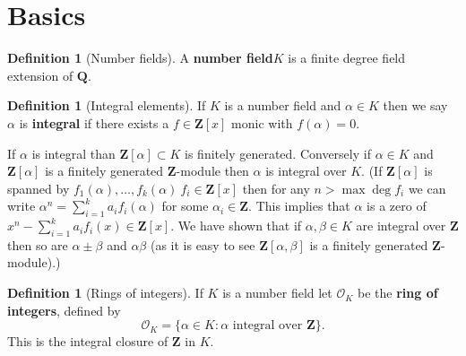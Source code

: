 \documentclass[10pt,]{book}
\newcommand{\gt}{>}
\newcommand{\terminology}[1]{\textbf{#1}}
\theoremstyle{plain}
\theoremstyle{definition}
\newtheorem{definition}[theorem]{Definition}
\newcommand{\QQ}{\mathbf{Q}}
\newcommand{\ZZ}{\mathbf{Z}}
\newcommand{\cO}{\mathcal{O}}
\begin{document}
\section[Basics]{Basics}\label{sec-basics}
\begin{definition}[Number fields]\label{definition-1}
A \terminology{number field}\(K\) is a finite degree field extension of \(\QQ\).\end{definition}
\begin{definition}[Integral elements]\label{definition-2}
If \(K\) is a number field and \(\alpha\in K\) then we say \(\alpha\) is \terminology{integral} if there exists a \(f\in\ZZ[x]\) monic with \(f(\alpha) = 0\).\end{definition}
If \(\alpha\) is integral than \(\ZZ[\alpha] \subset K\) is finitely generated.
          Conversely if \(\alpha\in K\) and \(\ZZ[\alpha]\) is a finitely generated \(\ZZ\)-module then \(\alpha\) is integral over \(K\).
          (If \(\ZZ[\alpha]\) is spanned by \(f_1(\alpha),\ldots,f_k(\alpha)\ f_i\in \ZZ[x]\) then for any \(n \gt \max\deg f_i\) we can write \(\alpha^n = \sum_{i=1}^k a_i f_i(\alpha)\) for some \(\alpha_i\in \ZZ\).
          This implies that \(\alpha\) is a zero of \(x^n - \sum_{i=1}^k a_i f_i(x) \in \ZZ[x]\).
          We have shown that if \(\alpha,\beta \in K\) are integral over \(\ZZ\) then so are \(\alpha\pm\beta\) and \(\alpha\beta\) (as it is easy to see \(\ZZ[\alpha,\beta]\) is a finitely generated \(\ZZ\)-module).)
\begin{definition}[Rings of integers]\label{definition-3}
If \(K\) is a number field let \(\cO_K\) be the \terminology{ring of integers}, defined by \[\cO_K = \{\alpha\in K : \alpha \text{ integral over }\ZZ\}.\]
            This is the integral closure of \(\ZZ\) in \(K\).
          \end{definition}
\typeout{************************************************}
\typeout{************************************************}
\end{document}
